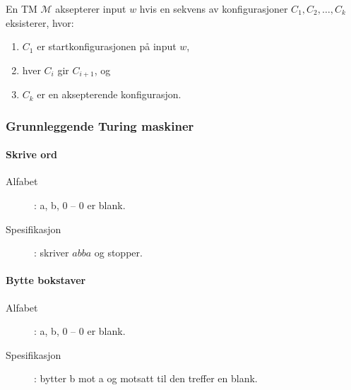 \documentclass[11pt,a4paper]{article}
\begin{document}
En TM $\mathcal{M}$ aksepterer input $w$ hvis en sekvens av konfigurasjoner $C_1, C_2, \dots,C_k$ eksisterer, hvor:
\begin{enumerate}
\item{$C_1$ er startkonfigurasjonen på input $w$,}
\item{hver $C_i$ gir $C_{i+1}$, og}
\item{$C_k$ er en aksepterende konfigurasjon.}
\end{enumerate}

\subsubsection{Grunnleggende Turing maskiner}

\paragraph{Skrive ord}
\begin{description}
\item[Alfabet]: a, b, 0 -- 0 er blank.
\item[Spesifikasjon]: skriver $abba$ og stopper.
\end{description}
\begin{figure}[h!]
\centering
{}
\end{figure}

\paragraph{Bytte bokstaver}
\begin{description}
\item[Alfabet]: a, b, 0 -- 0 er blank.
\item[Spesifikasjon]: bytter b mot a og motsatt til den treffer en blank.
\end{description}
\begin{figure}[h!]
\centering
{}
\end{figure}
\end{document}
